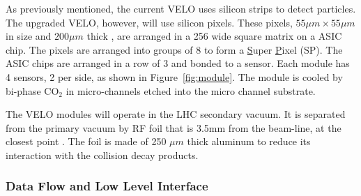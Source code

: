       As previously mentioned, the current VELO uses silicon strips to detect particles.
      The upgraded VELO, however, will use silicon pixels.
      These pixels, $55 \mu m \times 55 \mu m$ in size and $200 \mu m$ thick \cite{velo_design_report}, are arranged in a 256 wide square matrix on a ASIC chip.
      The pixels are arranged into groups of 8 to form a \underline{S}uper \underline{P}ixel (SP).
      The ASIC chips are arranged in a row of 3 and bonded to a sensor.
      Each module has 4 sensors, 2 per side, as shown in Figure~\ref{fig:module}. 
      The module is cooled by bi-phase CO$_2$ in micro-channels etched into the micro channel substrate. \cite{velo_design_report}
      \par
      The VELO modules will operate in the LHC secondary vacuum.
      It is separated from the primary vacuum by RF foil that is 3.5mm from the beam-line, at the closest point \cite{velo_design_report}.
      The foil is made of 250 $\mu m$ thick aluminum to reduce its interaction with the collision decay products. 

      \subsubsection{Data Flow and Low Level Interface}   

